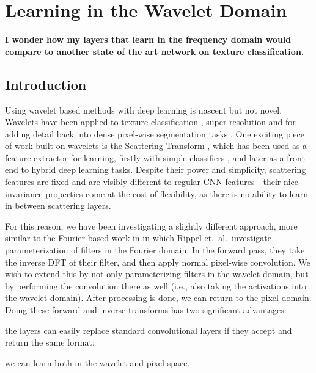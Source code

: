 \chapter{Learning in the Wavelet Domain}

\textbf{%
I wonder how my layers that learn in the frequency domain would compare to another state of the art
network on texture classification.
}



\section{Introduction}\label{sec:intro}
Using wavelet based methods with deep learning is nascent but not novel. Wavelets have been applied 
to texture classification \cite{fujieda_wavelet_2017, sifre_combined_2012}, super-resolution
\cite{guo_deep_2017} and for adding detail back into dense pixel-wise segmentation tasks
\cite{ma_detailed_2018}. One exciting piece of work built on wavelets is the Scattering Transform
\cite{mallat_group_2012}, which has been used as a feature extractor for learning, firstly with
simple classifiers \cite{bruna_invariant_2013, singh_scatternet_2017}, and later as a front end to
hybrid deep learning tasks\cite{oyallon_scaling_2017, singh_scatternet_2018}. Despite their power
and simplicity, scattering features are fixed and are visibly different to regular CNN features
\cite{cotter_visualizing_2017} - their nice invariance properties come at the cost of flexibility,
as there is no ability to learn in between scattering layers. 

For this reason, we have been investigating a slightly different approach, more similar to the Fourier based work in
\cite{rippel_spectral_2015} in which Rippel et.\ al.\ investigate parameterization of filters in the Fourier
domain. In the forward pass, they take the inverse DFT of their filter,
and then apply normal pixel-wise convolution. We wish to extend this by not only parameterizing
filters in the wavelet domain, but by performing the convolution there as well
(i.e., also taking the activations into the wavelet domain). After 
processing is done, we can return to the pixel domain. Doing these forward
and inverse transforms has two significant advantages: 
\begin{enumerate*}[label=\roman*)]
  \item the layers can easily replace standard convolutional layers if they accept and return the
    same format;
  \item we can learn both in the wavelet and pixel space.
\end{enumerate*}

